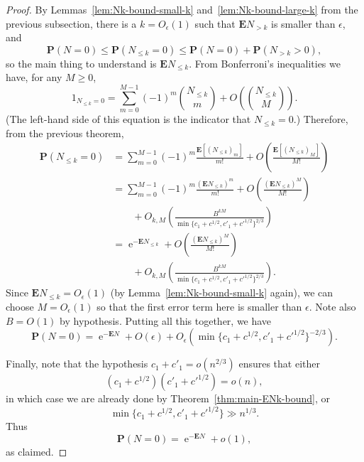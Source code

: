 \documentclass[10pt,a4paper]{amsart}
\theoremstyle{remark}
\DeclareMathOperator{\expe}{e}
\newcommand{\eps}{\epsilon}
\renewcommand\P{\mathbf{P}}
\newcommand\E{\mathbf{E}}
\newcommand\br[1]{\left({#1}\right)}
\newcommand\pfrac[2]{\br{\frac{#1}{#2}}}
\begin{document}
\begin{proof}
By Lemmas~\ref{lem:Nk-bound-small-k} and~\ref{lem:Nk-bound-large-k} from the previous subsection, there is a $k = O_\eps(1)$ such that $\E N_{>k}$ is smaller than $\eps$, and
\[
 \P(N = 0) \leq \P(N_{\leq k} = 0) \leq \P(N = 0) + \P(N_{>k} > 0),
\]
so the main thing to understand is $\E N_{\leq k}$. From Bonferroni's inequalities we have, for any $M\geq 0$,
\[
 1_{N_{\leq k}=0} = \sum_{m=0}^{M-1} (-1)^m \binom{N_{\leq k}}{m} + O\left(\binom{N_{\leq k}}{M}\right).
\]
(The left-hand side of this equation is the indicator that $N_{\leq k} = 0$.)
Therefore, from the previous theorem,
\begin{align*}
 \P(N_{\leq k} = 0)
 &= \sum_{m=0}^{M-1} (-1)^m \frac{ \E [(N_{\leq k})_{m}]}{m!} + O \pfrac{\E[ (N_{\leq k})_M]}{M!} \\
 &= \sum_{m=0}^{M-1} (-1)^m \frac{ (\E N_{\leq k})^m}{m!}
 + O\pfrac{(\E N_{\leq k})^M}{M!} \\
 &\qquad + O_{k, M} \left( 
 \frac{B^{kM}}{\min\{c_1 + c^{1/2}, c'_1 + {c'}^{1/2}\}^{2/3}}\right) \\
 &= \expe^{-\E N_{\leq k}} 
 + O\pfrac{(\E N_{\leq k})^M}{M!} \\
 &\qquad + O_{k, M} \left( 
 \frac{B^{kM}}{\min\{c_1 + c^{1/2}, c'_1 + {c'}^{1/2}\}^{2/3}}\right).
\end{align*}
Since $\E N_{\leq k} = O_\eps(1)$ (by Lemma~\ref{lem:Nk-bound-small-k} again), we can choose $M = O_\eps(1)$ so that the first error term here is smaller than $\eps$. Note also $B = O(1)$ by hypothesis. Putting all this together, we have
\[
 \P(N = 0) = \expe^{-\E N} + O(\eps) + O_{\eps}\left(\min\{c_1 + c^{1/2}, c'_1 + {c'}^{1/2}\}^{-2/3} \right).
\]

Finally, note that the hypothesis $c_1 + c'_1 = o(n^{2/3})$ ensures that either
\[
 (c_1 + c^{1/2}) (c'_1 + {c'}^{1/2}) = o(n),
\]
in which case we are already done by Theorem~\ref{thm:main-ENk-bound}, or
\[
 \min\{c_1 + c^{1/2}, c'_1 + {c'}^{1/2}\} \gg n^{1/3}.
\]
Thus
\[
 \P(N = 0) = \expe^{-\E N} + o(1),
\]
as claimed.
\end{proof}
\end{document}
